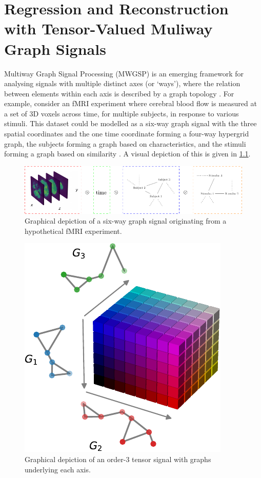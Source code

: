 

\chapter{Regression and Reconstruction with Tensor-Valued
Muliway Graph Signals}


\label{chap:nd_gsp}


Multiway Graph Signal Processing (MWGSP) is an emerging framework for analysing signals with multiple distinct axes (or `ways'), where the relation between elements within each axis is described by a graph topology \citep{Stanley2020}. For example, consider an fMRI experiment where cerebral blood flow is measured at a set of 3D voxels across time, for multiple subjects, in response to various stimuli. This dataset could be modelled as a six-way graph signal with the three spatial coordinates and the one time coordinate forming a four-way hypergrid graph, the subjects forming a graph based on characteristics, and the stimuli forming a graph based on similarity \citep{Cichocki2015}. A visual depiction of this is given in \cref{fig:fMRI_diagram}. 
 
\vspace{1.5cm}

\begin{figure}[h] 
    \begin{center}
        \includegraphics[width=\linewidth]{Figures/fMRI_Digaram.pdf}
    \end{center}
   \caption[Graphical depiction of an order-3 tensor]{Graphical depiction of a six-way graph signal originating from a hypothetical fMRI experiment. } 
    \label{fig:fMRI_diagram}
\end{figure} 


\begin{figure}[b] 
    \begin{center}
        \includegraphics[width=0.4\linewidth]{Figures/coloured_tensor.pdf}
    \end{center}
   \caption[Graphical depiction of an order-3 tensor]{Graphical depiction of an order-3 tensor signal with graphs underlying each axis. } 
    \label{fig:coloured_tensor}
\end{figure}  

